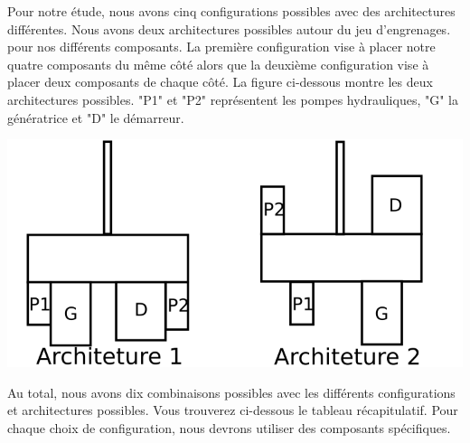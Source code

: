 \documentclass{config}
\begin{document}
\begin{spacing}{1.2}
Pour notre étude, nous avons cinq configurations possibles avec des architectures différentes. Nous avons deux architectures possibles autour du jeu d'engrenages. pour nos différents composants. La première configuration vise à placer notre quatre composants du même côté alors que la deuxième configuration vise à placer deux composants de chaque côté.
La figure ci-dessous montre les deux architectures possibles. "P1" et "P2" représentent les pompes hydrauliques, "G" la génératrice et "D" le démarreur. 

\begin{center}
\includegraphics[scale=0.8]{architecture.png}
\end{center}

Au total, nous avons dix combinaisons possibles avec les différents configurations et architectures possibles. Vous trouverez ci-dessous le tableau récapitulatif. Pour chaque choix de configuration, nous devrons utiliser des composants spécifiques.

\begin{table}[h]
\centering
{}
\end{table}


\end{spacing}
\end{document}
